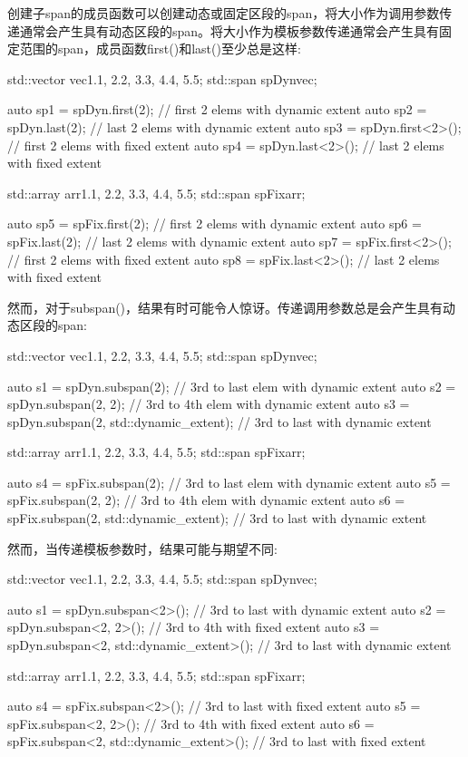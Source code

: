
创建子span的成员函数可以创建动态或固定区段的span，将大小作为调用参数传递通常会产生具有动态区段的span。将大小作为模板参数传递通常会产生具有固定范围的span，成员函数first()和last()至少总是这样:

\begin{cpp}
std::vector vec{1.1, 2.2, 3.3, 4.4, 5.5};
std::span spDyn{vec};

auto sp1 = spDyn.first(2); // first 2 elems with dynamic extent
auto sp2 = spDyn.last(2); // last 2 elems with dynamic extent
auto sp3 = spDyn.first<2>(); // first 2 elems with fixed extent
auto sp4 = spDyn.last<2>(); // last 2 elems with fixed extent

std::array arr{1.1, 2.2, 3.3, 4.4, 5.5};
std::span spFix{arr};

auto sp5 = spFix.first(2); // first 2 elems with dynamic extent
auto sp6 = spFix.last(2); // last 2 elems with dynamic extent
auto sp7 = spFix.first<2>(); // first 2 elems with fixed extent
auto sp8 = spFix.last<2>(); // last 2 elems with fixed extent
\end{cpp}

然而，对于subspan()，结果有时可能令人惊讶。传递调用参数总是会产生具有动态区段的span:

\begin{cpp}
std::vector vec{1.1, 2.2, 3.3, 4.4, 5.5};
std::span spDyn{vec};

auto s1 = spDyn.subspan(2); // 3rd to last elem with dynamic extent
auto s2 = spDyn.subspan(2, 2); // 3rd to 4th elem with dynamic extent
auto s3 = spDyn.subspan(2, std::dynamic_extent); // 3rd to last with dynamic extent

std::array arr{1.1, 2.2, 3.3, 4.4, 5.5};
std::span spFix{arr};

auto s4 = spFix.subspan(2); // 3rd to last elem with dynamic extent
auto s5 = spFix.subspan(2, 2); // 3rd to 4th elem with dynamic extent
auto s6 = spFix.subspan(2, std::dynamic_extent); // 3rd to last with dynamic extent
\end{cpp}

然而，当传递模板参数时，结果可能与期望不同:

\begin{cpp}
std::vector vec{1.1, 2.2, 3.3, 4.4, 5.5};
std::span spDyn{vec};

auto s1 = spDyn.subspan<2>(); // 3rd to last with dynamic extent
auto s2 = spDyn.subspan<2, 2>(); // 3rd to 4th with fixed extent
auto s3 = spDyn.subspan<2, std::dynamic_extent>(); // 3rd to last with dynamic extent

std::array arr{1.1, 2.2, 3.3, 4.4, 5.5};
std::span spFix{arr};

auto s4 = spFix.subspan<2>(); // 3rd to last with fixed extent
auto s5 = spFix.subspan<2, 2>(); // 3rd to 4th with fixed extent
auto s6 = spFix.subspan<2, std::dynamic_extent>(); // 3rd to last with fixed extent
\end{cpp}


